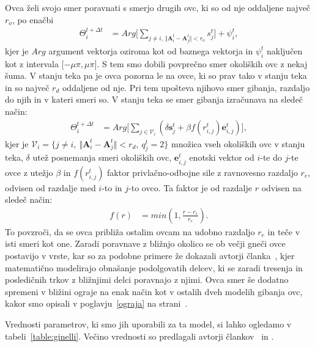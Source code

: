 Ovca želi svojo smer poravnati s smerjo drugih ovc, ki so od nje oddaljene največ $r_o$, po enačbi
\begin{align}
\Theta_i^{t+\Delta t} &= Arg\lbrack\sum_{j\not=i,~\Vert \mathbf{A}_i^t - \mathbf{A}_j^t\Vert < r_o}s_j^t\rbrack+\psi_i^t, \label{eq:ginelli-hoja}
\end{align}
kjer je $Arg$ argument vektorja oziroma kot od baznega vektorja in $\psi_i^t$ naključen kot z intervala $\lbrack-\mu\pi,\mu\pi\rbrack$. S tem smo dobili povprečno smer okoliških ovc z nekaj šuma. V stanju teka pa je ovca pozorna le na ovce, ki so prav tako v stanju teka in so največ $r_d$ oddaljene od nje. Pri tem upošteva njihovo smer gibanja, razdaljo do njih in v kateri smeri so. V stanju teka se smer gibanja izračunava na sledeč način:
\begin{align}
\Theta_i^{t+\Delta t} &= Arg\lbrack\sum_{j\in \mathcal{V}_i}(\delta \mathbf{s}_j^t+\beta f(r_{i,j}^t)\mathbf{e}_{i,j}^t)\rbrack, \label{eq:ginelli-tek}
\end{align}
kjer je $\mathcal{V}_i = \lbrace j\not=i,~\Vert \mathbf{A}_i^t - \mathbf{A}_j^t\Vert < r_d,~q_j^t=2\rbrace$ množica vseh okoliških ovc v stanju teka, $\delta$ utež posnemanja smeri okoliških ovc, $\mathbf{e}_{i,j}^t$ enotski vektor od $i$-te do $j$-te ovce z utežjo $\beta$ in $f(r_{i,j}^t)$ faktor privlačno-odbojne sile z ravnovesno razdaljo $r_e$, odvisen od razdalje med $i$-to in $j$-to ovco. Ta faktor je od razdalje $r$ odvisen na sledeč način:
\begin{align}
f(r) &= min(1, \frac{r-r_e}{r_e}). \label{eq:ginelli-faktor}
\end{align}
To povzroči, da se ovca približa ostalim ovcam na udobno razdaljo $r_e$ in teče v isti smeri kot one. Zaradi poravnave z bližnjo okolico se ob večji gneči ovce postavijo v vrste, kar so za podobne primere že dokazali avtorji članka~\cite{degond2015continuum}, kjer matematično modelirajo obnašanje podolgovatih delcev, ki se zaradi tresenja in posledičnih trkov z bližnjimi delci poravnajo z njimi. Ovca smer še dodatno spremeni v bližini ograje na enak način kot v ostalih dveh modelih gibanja ovc, kakor smo opisali v poglavju~\ref{ograja} na strani~\pageref{ograja}.

Vrednosti parametrov, ki smo jih uporabili za ta model, si lahko ogledamo v tabeli~\ref{table:ginelli}. Večino vrednosti so predlagali avtorji člankov~\cite{Ginelli} in \cite{Demsar}.

